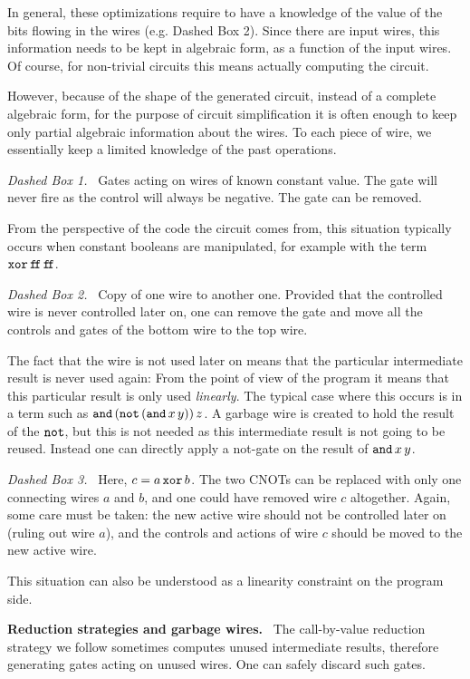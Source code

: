 \documentclass{article}
\theoremstyle{plain}
\theoremstyle{definition}
\newcommand{\ffalse}{\mathtt{f\!f}}
\begin{document}
In general, these optimizations require to have a knowledge of the
value of the bits flowing in the wires (e.g. Dashed Box 2). Since
there are input wires, this information needs to be kept in algebraic
form, as a function of the input wires. Of course, for non-trivial
circuits this means actually computing the circuit.

However, because of the shape of the generated circuit, instead of a
complete algebraic form, for the purpose of circuit simplification it
is often enough to keep only partial algebraic information about the
wires. To each piece of wire, we essentially keep a limited knowledge
of the past operations.

\smallskip
\noindent
{\it Dashed Box 1.}~ Gates acting on wires of known constant value. The
gate will never fire as the control will always be negative. The
gate can be removed.

From the perspective of the code the circuit comes from, this
situation typically occurs when constant booleans are manipulated, for
example with the term ${\tt xor}\,\ffalse\,\ffalse$.

\smallskip
\noindent
{\it Dashed Box 2.}~ Copy of one wire to another one.
Provided that the controlled wire is never controlled later on, one
can remove the gate and move all the controls and gates of the bottom
wire to the top wire.

The fact that the wire is not used later on means that the particular
intermediate result is never used again: From the point of view of the
program it means that this particular result is only used {\em
  linearly}. The typical case where this occurs is in a term such as
${\tt and}\,({\tt not}\,({\tt and}\,x\,y))\,z$. A garbage wire 
is created to hold the result of the ${\tt not}$, but this is not
needed as this intermediate result is not going to be reused. Instead
one can directly apply a not-gate on the result of ${\tt and}\,x\,y$.

\smallskip
\noindent
{\it Dashed Box 3.}~ Here, $c = a\,{\tt xor}\,b$. The two CNOTs can
be replaced with only one connecting wires $a$ and $b$, and one
could have removed wire $c$ altogether.
Again, some care must be taken: the new active wire should not be
controlled later on (ruling out wire $a$), and the controls and
actions of wire $c$ should be moved to the new active wire.

This situation can also be understood as a linearity constraint on the
program side.


\smallskip
\noindent
{\bf Reduction strategies and garbage wires.}~
The call-by-value reduction strategy we follow sometimes computes
unused intermediate results, therefore generating gates acting on
unused wires. One can safely discard such gates.
\end{document}

